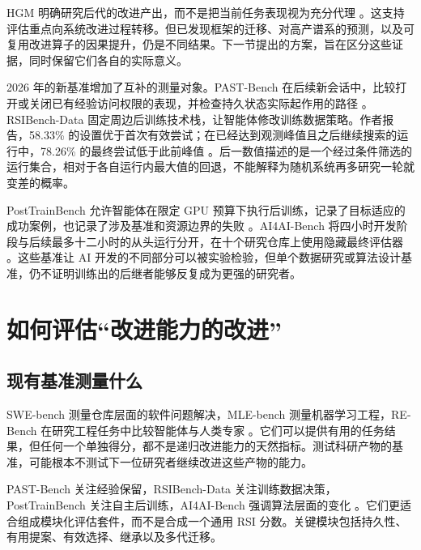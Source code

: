 \documentclass[11pt,,]{article}
\begin{document}
HGM 明确研究后代的改进产出，而不是把当前任务表现视为充分代理
\citep{hgm2025}。这支持评估重点向系统改进过程转移。但已发现框架的迁移、对高产谱系的预测，以及可复用改进算子的因果提升，仍是不同结果。下一节提出的方案，旨在区分这些证据，同时保留它们各自的实际意义。

2026 年的新基准增加了互补的测量对象。PAST-Bench
在后续新会话中，比较打开或关闭已有经验访问权限的表现，并检查持久状态实际起作用的路径
\citep{pastbench2026}。RSIBench-Data
固定周边后训练技术栈，让智能体修改训练数据策略。作者报告，58.33\%
的设置优于首次有效尝试；在已经达到观测峰值且之后继续搜索的运行中，78.26\%
的最终尝试低于此前峰值
\citep{rsidata2026}。后一数值描述的是一个经过条件筛选的运行集合，相对于各自运行内最大值的回退，不能解释为随机系统再多研究一轮就变差的概率。

PostTrainBench 允许智能体在限定 GPU
预算下执行后训练，记录了目标适应的成功案例，也记录了涉及基准和资源边界的失败
\citep{posttrain2026}。AI4AI-Bench
将四小时开发阶段与后续最多十二小时的从头运行分开，在十个研究仓库上使用隐藏最终评估器
\citep{ai4ai2026}。这些基准让 AI
开发的不同部分可以被实验检验，但单个数据研究或算法设计基准，仍不证明训练出的后继者能够反复成为更强的研究者。

\hypertarget{ux5982ux4f55ux8bc4ux4f30ux6539ux8fdbux80fdux529bux7684ux6539ux8fdb}{%
\section{如何评估``改进能力的改进''}\label{ux5982ux4f55ux8bc4ux4f30ux6539ux8fdbux80fdux529bux7684ux6539ux8fdb}}

\hypertarget{ux73b0ux6709ux57faux51c6ux6d4bux91cfux4ec0ux4e48}{%
\subsection{现有基准测量什么}\label{ux73b0ux6709ux57faux51c6ux6d4bux91cfux4ec0ux4e48}}

SWE-bench 测量仓库层面的软件问题解决，MLE-bench
测量机器学习工程，RE-Bench 在研究工程任务中比较智能体与人类专家
\citep{swebench2023, mlebench2024, rebench2024}。它们可以提供有用的任务结果，但任何一个单独得分，都不是递归改进能力的天然指标。测试科研产物的基准，可能根本不测试下一位研究者继续改进这些产物的能力。

PAST-Bench 关注经验保留，RSIBench-Data 关注训练数据决策，PostTrainBench
关注自主后训练，AI4AI-Bench 强调算法层面的变化
\citep{pastbench2026, rsidata2026, posttrain2026, ai4ai2026}。它们更适合组成模块化评估套件，而不是合成一个通用
RSI 分数。关键模块包括持久性、有用提案、有效选择、继承以及多代迁移。
\end{document}
